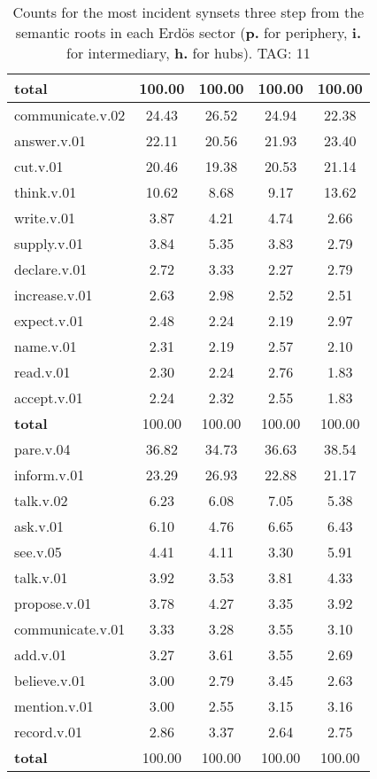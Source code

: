 \begin{table}[h!]
\begin{center}
\begin{tabular}{| l || c | c | c | c |}
{{\bf total}} & 100.00  & 100.00  & 100.00  & 100.00 \\\hline\hline\hline
communicate.v.02 & 24.43  & 26.52  & 24.94  & 22.38 \\\hline
answer.v.01 & 22.11  & 20.56  & 21.93  & 23.40 \\\hline
cut.v.01 & 20.46  & 19.38  & 20.53  & 21.14 \\\hline
think.v.01 & 10.62  & 8.68  & 9.17  & 13.62 \\\hline
write.v.01 & 3.87  & 4.21  & 4.74  & 2.66 \\\hline
supply.v.01 & 3.84  & 5.35  & 3.83  & 2.79 \\\hline
declare.v.01 & 2.72  & 3.33  & 2.27  & 2.79 \\\hline
increase.v.01 & 2.63  & 2.98  & 2.52  & 2.51 \\\hline
expect.v.01 & 2.48  & 2.24  & 2.19  & 2.97 \\\hline
name.v.01 & 2.31  & 2.19  & 2.57  & 2.10 \\\hline
read.v.01 & 2.30  & 2.24  & 2.76  & 1.83 \\\hline
accept.v.01 & 2.24  & 2.32  & 2.55  & 1.83 \\\hline\hline
{{\bf total}} & 100.00  & 100.00  & 100.00  & 100.00 \\\hline\hline\hline
pare.v.04 & 36.82  & 34.73  & 36.63  & 38.54 \\\hline
inform.v.01 & 23.29  & 26.93  & 22.88  & 21.17 \\\hline
talk.v.02 & 6.23  & 6.08  & 7.05  & 5.38 \\\hline
ask.v.01 & 6.10  & 4.76  & 6.65  & 6.43 \\\hline
see.v.05 & 4.41  & 4.11  & 3.30  & 5.91 \\\hline
talk.v.01 & 3.92  & 3.53  & 3.81  & 4.33 \\\hline
propose.v.01 & 3.78  & 4.27  & 3.35  & 3.92 \\\hline
communicate.v.01 & 3.33  & 3.28  & 3.55  & 3.10 \\\hline
add.v.01 & 3.27  & 3.61  & 3.55  & 2.69 \\\hline
believe.v.01 & 3.00  & 2.79  & 3.45  & 2.63 \\\hline
mention.v.01 & 3.00  & 2.55  & 3.15  & 3.16 \\\hline
record.v.01 & 2.86  & 3.37  & 2.64  & 2.75 \\\hline\hline
{{\bf total}} & 100.00  & 100.00  & 100.00  & 100.00 \\\hline
\end{tabular}
\caption{Counts for the most incident synsets three step from the semantic roots in each Erd\"os sector ({\bf p.} for periphery, {\bf i.} for intermediary, {\bf h.} for hubs). TAG: 11}
\end{center}
\end{table}